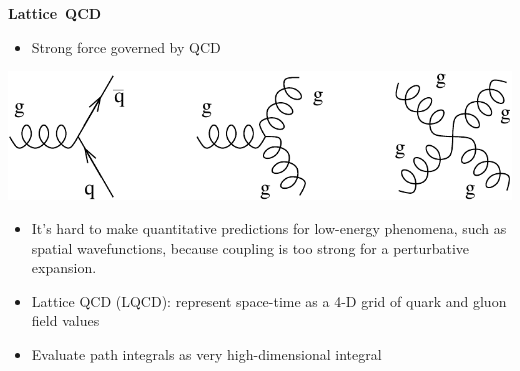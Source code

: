 \documentclass[landscape]{article}
\newenvironment{slide}[1][ ]{\mbox{\bf #1 } \vfill}{\vfill \mbox{ } \pagebreak}
\begin{document}
\begin{slide}[Lattice QCD]

\begin{minipage}{0.5\linewidth}
  \begin{itemize}
    \item Strong force governed by QCD
  \end{itemize}
\end{minipage} \hfill \begin{minipage}{0.45\linewidth}
  \includegraphics[width=\linewidth]{diagram_qcd}
\end{minipage}

\vfill

\begin{itemize}
  \item It's hard to make quantitative predictions for low-energy
  phenomena, such as spatial wavefunctions, because coupling is too
  strong for a perturbative expansion.
\end{itemize}

\vfill
\begin{minipage}{0.5\linewidth}
  \begin{itemize}
    \item Lattice QCD (LQCD): represent space-time as a 4-D grid of
	quark and gluon field values

    \vspace{1 cm}
    \item Evaluate path integrals as very high-dimensional integral


\end{itemize}
\end{minipage}
\end{slide}
\end{document}

